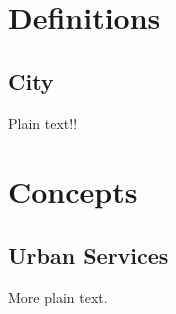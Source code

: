 \section{Definitions}


\subsection{City}


Plain text!!


	


\section{Concepts}

\subsection{Urban Services}

More plain text. 

